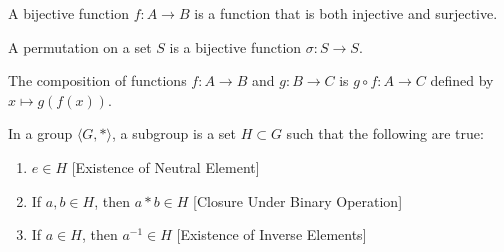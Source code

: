 \documentclass[../main.tex]{subfiles}
\begin{document}
%
\begin{definition}
A bijective function $f:A\rightarrow B$ is a function that is both injective and surjective.
\end{definition}
%
\begin{definition}
A permutation on a set $S$ is a bijective function $\sigma:S\rightarrow S$.
\end{definition}
%
\begin{definition}
The composition of functions $f:A\rightarrow B$ and $g:B\rightarrow C$ is $g\circ f:A\rightarrow C$ defined by $x\mapsto g(f(x))$.
\end{definition}
%
\begin{definition}
In a group $\langle G,*\rangle$, a subgroup is a set $H\subset G$ such that the following are true:
\begin{enumerate}
\item $e\in H$ \hfill [Existence of Neutral Element]
\item If $a,b\in H$, then $a*b \in H$ \hfill [Closure Under Binary Operation]
\item If $a\in H$, then $a^{-1}\in H$ \hfill [Existence of Inverse Elements]
\end{enumerate}
\end{definition}
%
\end{document}
